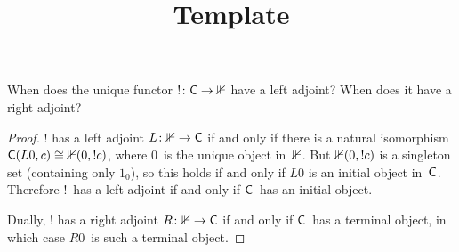 \documentclass[../../solutions]{subfiles}
\title{Template}
\author{}
\begin{document}
\maketitle

%   

\begin{exercise}
  When does the unique functor ${!}\colon{{\mathsf{C}}}\to{\mathbb{1}}$ have a left
  adjoint?  When does it have a right adjoint?
\end{exercise}

\begin{proof}
  $!$ has a left adjoint ${L}\colon{\mathbb{1}}\to{{\mathsf{C}}}$ if and only if there is
  a natural isomorphism ${\mathsf{C}}(L0,c)\cong \mathbb{1}(0,!c)$, where $0$~is the
  unique object in~$\mathbb{1}$.  But $\mathbb{1}(0,!c)$ is a singleton set
  (containing only $1_0$), so this holds if and only if $L0$ is an
  initial object in~${\mathsf{C}}$.  Therefore $!$~has a left adjoint if and
  only if ${\mathsf{C}}$~has an initial object.

  Dually, $!$ has a right adjoint ${R}\colon{\mathbb{1}}\to{{\mathsf{C}}}$ if and only if
  ${\mathsf{C}}$~has a terminal object, in which case $R0$~is such a terminal
  object.
\end{proof}
\end{document}
